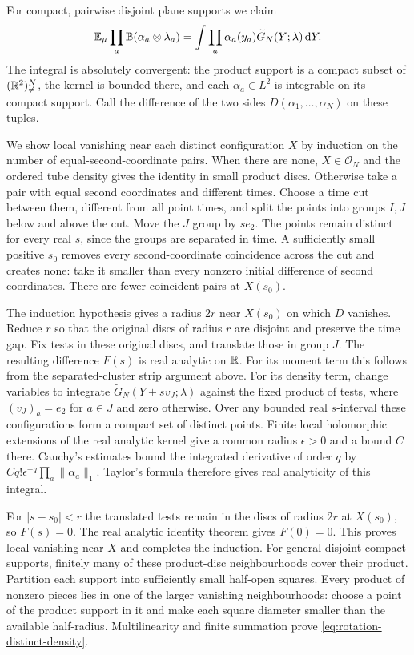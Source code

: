 For compact, pairwise disjoint plane supports we claim
\begin{equation}\label{eq:rotation-distinct-density}
 \mathbb E_\mu\prod_a\mathbb B(\alpha_a\otimes\lambda_a)
 =\int\prod_a\alpha_a(y_a)\widetilde G_N(Y;\lambda)\,\mathrm d Y.
\end{equation}
The integral is absolutely convergent: the product support
is a compact subset of $(\mathbb R^2)^N_{\ne}$, the kernel is bounded
there, and each $\alpha_a\in L^2$ is integrable on its compact
support.
Call the difference of the two sides $D(\alpha_1,\ldots,\alpha_N)$
on these tuples.

We show local vanishing near each distinct configuration $X$
by induction on the number of equal-second-coordinate pairs.
When there are none, $X\in\mathcal O_N$ and the ordered tube
density gives the identity in small product discs.
Otherwise take a pair with equal second coordinates and
different times. Choose a time cut between them, different
from all point times, and split the points into groups $I,J$
below and above the cut.
Move the $J$ group by $se_2$. The points remain distinct for
every real $s$, since the groups are separated in time.
A sufficiently small positive $s_0$ removes every
second-coordinate coincidence across the cut and creates none:
take it smaller than every nonzero initial difference of
second coordinates.
There are fewer coincident pairs at $X(s_0)$.

The induction hypothesis gives a radius $2r$ near $X(s_0)$
on which $D$ vanishes. Reduce $r$ so that the original discs
of radius $r$ are disjoint and preserve the time gap.
Fix tests in these original discs, and translate those in
group $J$. The resulting difference $F(s)$ is real analytic
on $\mathbb R$.
For its moment term this follows from the separated-cluster
strip argument above. For its density term, change variables
to integrate
$\widetilde G_N(Y+sv_J;\lambda)$ against the fixed product
of tests, where $(v_J)_a=e_2$ for $a\in J$ and zero otherwise.
Over any bounded real $s$-interval these configurations form
a compact set of distinct points. Finite local holomorphic
extensions of the real analytic kernel give a common radius
$\epsilon>0$ and a bound $C$ there. Cauchy's estimates bound
the integrated derivative of order $q$ by
$Cq!\epsilon^{-q}\prod_a\|\alpha_a\|_1$.
Taylor's formula therefore gives real analyticity of this
integral.

For $|s-s_0|<r$ the translated tests remain in the discs of
radius $2r$ at $X(s_0)$, so $F(s)=0$.
The real analytic identity theorem gives $F(0)=0$.
This proves local vanishing near $X$ and completes the induction.
For general disjoint compact supports, finitely many of these
product-disc neighbourhoods cover their product.
Partition each support into sufficiently small half-open
squares. Every product of nonzero pieces lies in one of the
larger vanishing neighbourhoods: choose a point of the
product support in it and make each square diameter smaller
than the available half-radius.
Multilinearity and finite summation prove
\eqref{eq:rotation-distinct-density}.

